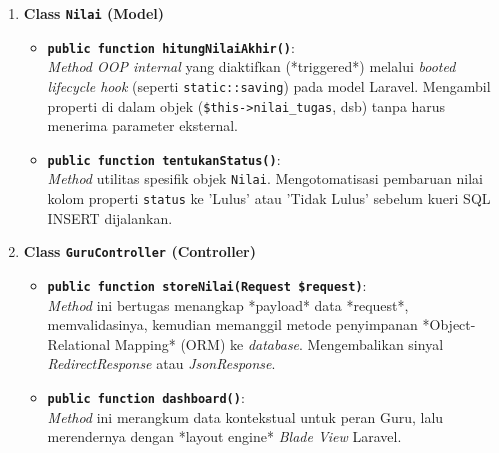 \documentclass[12pt, a4paper]{article}
\begin{document}
\begin{enumerate}
    \item \textbf{Class \texttt{Nilai} (Model)}
    \begin{itemize}
        \item \textbf{\texttt{public function hitungNilaiAkhir()}}: \\
        \textit{Method OOP internal} yang diaktifkan (*triggered*) melalui \textit{booted lifecycle hook} (seperti \texttt{static::saving}) pada model Laravel. Mengambil properti di dalam objek (\texttt{\$this->nilai\_tugas}, dsb) tanpa harus menerima parameter eksternal.
        \item \textbf{\texttt{public function tentukanStatus()}}: \\
        \textit{Method} utilitas spesifik objek \texttt{Nilai}. Mengotomatisasi pembaruan nilai kolom properti \texttt{status} ke 'Lulus' atau 'Tidak Lulus' sebelum kueri SQL INSERT dijalankan.
    \end{itemize}

    \item \textbf{Class \texttt{GuruController} (Controller)}
    \begin{itemize}
        \item \textbf{\texttt{public function storeNilai(Request \$request)}}: \\
        \textit{Method} ini bertugas menangkap *payload* data *request*, memvalidasinya, kemudian memanggil metode penyimpanan *Object-Relational Mapping* (ORM) ke \textit{database}. Mengembalikan sinyal \textit{RedirectResponse} atau \textit{JsonResponse}.
        \item \textbf{\texttt{public function dashboard()}}: \\
        \textit{Method} ini merangkum data kontekstual untuk peran Guru, lalu merendernya dengan *layout engine* \textit{Blade View} Laravel.
    \end{itemize}
\end{enumerate}
\end{document}
